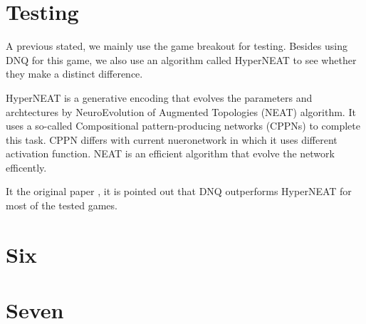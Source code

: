 \documentclass{article}
\begin{document}
\section{Testing}

A previous stated, we mainly use the game breakout for testing. Besides using DNQ for this game, we also use an algorithm called HyperNEAT to see whether they make a distinct difference.

HyperNEAT is a generative encoding that evolves the parameters and archtectures by NeuroEvolution of Augmented Topologies (NEAT) algorithm\citep{stanley2006exploiting}. It uses a so-called Compositional pattern-producing networks (CPPNs) to complete this task. CPPN differs with current nueronetwork in which it uses different activation function. NEAT is an efficient algorithm that evolve the network efficently.

It the original paper \citep{mnih2013playing}, it is pointed out that DNQ outperforms HyperNEAT for most of the tested games.


\section{Six}
\section{Seven}
\nocite{langley00}


\end{document}

